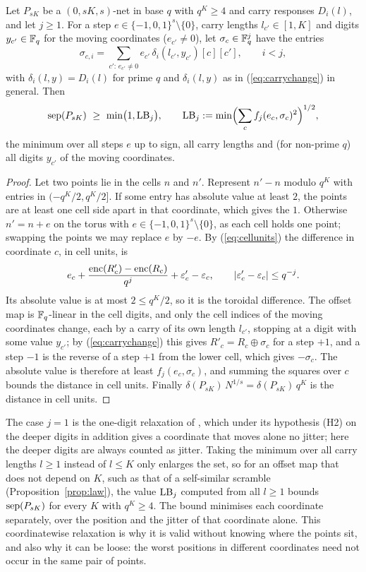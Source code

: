 \begin{lemma}\label{lem:cert}
Let $P_{sK}$ be a $(0,sK,s)$-net in base $q$ with $q^K\ge4$ and carry responses $D_i(l)$, and let $j\ge1$. For a step $e\in\{-1,0,1\}^s\setminus\{0\}$, carry lengths $l_{c'}\in[1,K]$ and digits $y_{c'}\in\mathbb{F}_q$ for the moving coordinates ($e_{c'}\ne0$), let $\sigma_c\in\mathbb{F}_q^j$ have the entries
\[
\sigma_{c,i}=\sum_{c':\,e_{c'}\ne0}e_{c'}\,\delta_i(l_{c'},y_{c'})[c][c'],\qquad i<j,
\]
with $\delta_i(l,y)=D_i(l)$ for prime $q$ and $\delta_i(l,y)$ as in (\ref{eq:carrychange}) in general. Then
\[
\sep{P_{sK}}\ \ge\ \min\bigl(1,\LB_j\bigr),\qquad \LB_j:=\min\Bigl(\sum_cf_j(e_c,\sigma_c)^2\Bigr)^{1/2},
\]
the minimum over all steps $e$ up to sign, all carry lengths and (for non-prime $q$) all digits $y_{c'}$ of the moving coordinates.
\end{lemma}

\begin{proof}
Let two points lie in the cells $n$ and $n'$. Represent $n'-n$ modulo $q^K$ with entries in $(-q^K/2,q^K/2]$. If some entry has absolute value at least $2$, the points are at least one cell side apart in that coordinate, which gives the $1$. Otherwise $n'=n+e$ on the torus with $e\in\{-1,0,1\}^s\setminus\{0\}$, as each cell holds one point; swapping the points we may replace $e$ by $-e$. By (\ref{eq:cellunits}) the difference in coordinate $c$, in cell units, is
\[
e_c+\frac{\operatorname{enc}(R'_c)-\operatorname{enc}(R_c)}{q^j}+\varepsilon'_c-\varepsilon_c,\qquad|\varepsilon'_c-\varepsilon_c|\le q^{-j}.
\]
Its absolute value is at most $2\le q^K/2$, so it is the toroidal difference. The offset map is $\mathbb{F}_q$-linear in the cell digits, and only the cell indices of the moving coordinates change, each by a carry of its own length $l_{c'}$, stopping at a digit with some value $y_{c'}$; by (\ref{eq:carrychange}) this gives $R'_c=R_c\oplus\sigma_c$ for a step $+1$, and a step $-1$ is the reverse of a step $+1$ from the lower cell, which gives $-\sigma_c$. The absolute value is therefore at least $f_j(e_c,\sigma_c)$, and summing the squares over $c$ bounds the distance in cell units. Finally $\delta(P_{sK})\,N^{1/s}=\delta(P_{sK})\,q^K$ is the distance in cell units.
\end{proof}

The case $j=1$ is the one-digit relaxation of \cite{Gru26geo}%
, which under its hypothesis (H2) on the deeper digits in addition gives a coordinate that moves alone no jitter; here the deeper digits are always counted as jitter. Taking the minimum over all carry lengths $l\ge1$ instead of $l\le K$ only enlarges the set, so for an offset map that does not depend on $K$, such as that of a self-similar scramble (Proposition~\ref{prop:law}), the value $\mathrm{LB}_j$ computed from all $l\ge1$ bounds $\operatorname{sep}(P_{sK})$ for every $K$ with $q^K\ge4$. The bound minimises each coordinate separately, over the position and the jitter of that coordinate alone. This coordinatewise relaxation is why it is valid without knowing where the points sit, and also why it can be loose: the worst positions in different coordinates need not occur in the same pair of points.

